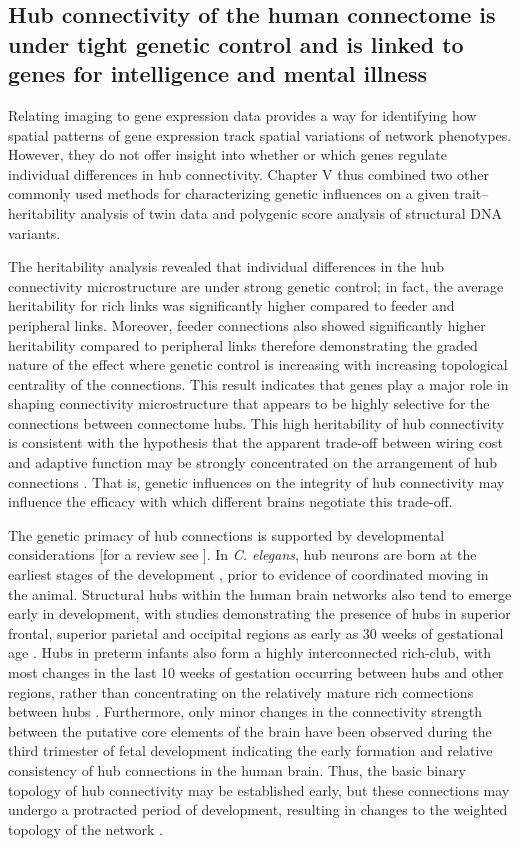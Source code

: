 \subsection*{Hub connectivity of the human connectome is under tight genetic control and is linked to genes for intelligence and mental illness}

Relating imaging to gene expression data provides a way for identifying how spatial patterns of gene expression track spatial variations of network phenotypes. However, they do not offer insight into whether or which genes regulate individual differences in hub connectivity. Chapter V thus combined two other commonly used methods for characterizing genetic influences on a given trait--heritability analysis of twin data and polygenic score analysis of structural DNA variants.

The heritability analysis revealed that individual differences in the hub connectivity microstructure are under strong genetic control; in fact, the average heritability for rich links was significantly higher compared to feeder and peripheral links. Moreover, feeder connections also showed significantly higher heritability compared to peripheral links therefore demonstrating the graded nature of the effect where genetic control is increasing with increasing topological centrality of the connections. This result indicates that genes play a major role in shaping connectivity microstructure that appears to be highly selective for the connections between connectome hubs. This high heritability of hub connectivity is consistent with the hypothesis that the apparent trade-off between wiring cost and adaptive function may be strongly concentrated on the arrangement of hub connections \citep{Bullmore2012}. That is, genetic influences on the integrity of hub connectivity may influence the efficacy with which different brains negotiate this trade-off.
	
The genetic primacy of hub connections is supported by developmental considerations [for a review see \citep{Oldham2018}]. In \textit{C. elegans}, hub neurons are born at the earliest stages of the development \citep{Varier2011}, prior to evidence of coordinated moving in the animal. Structural hubs within the human brain networks also tend to emerge early in development, with studies demonstrating the presence of hubs in superior frontal, superior parietal and occipital regions as early as 30 weeks of gestational age \citep{Ball2014}. Hubs in preterm infants also form a highly interconnected rich-club, with most changes in the last 10 weeks of gestation occurring between hubs and other regions, rather than concentrating on the relatively mature rich connections between hubs \citep{Ball2014}. Furthermore, only minor changes in the connectivity strength between the putative core elements of the brain have been observed during the third trimester of fetal development \citep{Batalle2017} indicating the early formation and relative consistency of hub connections in the human brain. Thus, the basic binary topology of hub connectivity may be established early, but these connections may undergo a protracted period of development, resulting in changes to the weighted topology of the network \citep{Baker2015a,Oldham2018}.
	
